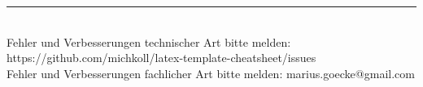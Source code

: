 \rule{0.3\linewidth}{0.25pt}
\\Fehler und Verbesserungen technischer Art bitte melden: https://github.com/michkoll/latex-template-cheatsheet/issues
\\Fehler und Verbesserungen fachlicher Art bitte melden: marius.goecke@gmail.com
\scriptsize


